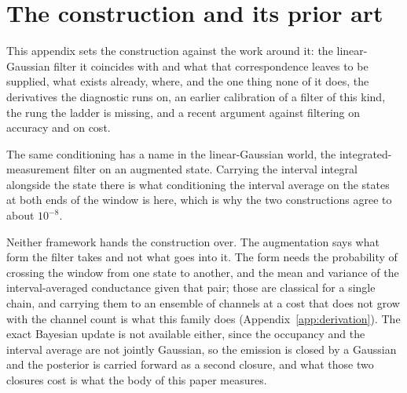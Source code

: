 \begin{appendixbox}
\label{app:priorart}
\section*{The construction and its prior art}

This appendix sets the construction against the work around it: the linear-Gaussian filter it
coincides with and what that correspondence leaves to be supplied, what exists already, where, and
the one thing none of it does,
the derivatives the diagnostic runs on, an earlier calibration of a filter of this kind, the rung
the ladder is missing, and a recent argument against filtering on accuracy and on cost. %

The same conditioning has a name in the linear-Gaussian world, the integrated-measurement filter on an augmented state. Carrying the interval integral alongside the state there is what conditioning the interval average on the states at both ends of the window is here, which is why the two constructions agree to about $10^{-8}$. %

Neither framework hands the construction over. The augmentation says what form the filter takes and not what goes into it. The form needs the probability of crossing the window from one state to another, and the mean and variance of the interval-averaged conductance given that pair; those are classical for a single chain, and carrying them to an ensemble of channels at a cost that does not grow with the channel count is what this family does (Appendix~\ref{app:derivation}). The exact Bayesian update is not available either, since the occupancy and the interval average are not jointly Gaussian, so the emission is closed by a Gaussian and the posterior is carried forward as a second closure, and what those two closures cost is what the body of this paper measures. %


\end{appendixbox}
